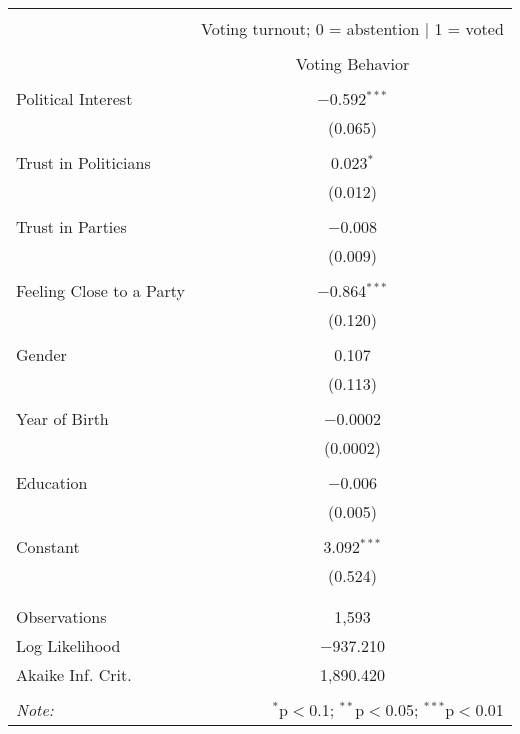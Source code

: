
\begin{table}[!htbp] \centering 
  \caption{} 
  \label{} 
\begin{tabular}{@{\extracolsep{5pt}}lc} 
\\[-1.8ex]\hline 
\hline \\[-1.8ex] 
 & \multicolumn{1}{c}{Voting turnout; 0 = abstention | 1 = voted} \\ 
\cline{2-2} 
\\[-1.8ex] & Voting Behavior \\ 
\hline \\[-1.8ex] 
 Political Interest & $-$0.592$^{***}$ \\ 
  & (0.065) \\ 
  & \\ 
 Trust in Politicians & 0.023$^{*}$ \\ 
  & (0.012) \\ 
  & \\ 
 Trust in Parties & $-$0.008 \\ 
  & (0.009) \\ 
  & \\ 
 Feeling Close to a Party & $-$0.864$^{***}$ \\ 
  & (0.120) \\ 
  & \\ 
 Gender & 0.107 \\ 
  & (0.113) \\ 
  & \\ 
 Year of Birth & $-$0.0002 \\ 
  & (0.0002) \\ 
  & \\ 
 Education & $-$0.006 \\ 
  & (0.005) \\ 
  & \\ 
 Constant & 3.092$^{***}$ \\ 
  & (0.524) \\ 
  & \\ 
\hline \\[-1.8ex] 
Observations & 1,593 \\ 
Log Likelihood & $-$937.210 \\ 
Akaike Inf. Crit. & 1,890.420 \\ 
\hline 
\hline \\[-1.8ex] 
\textit{Note:}  & \multicolumn{1}{r}{$^{*}$p$<$0.1; $^{**}$p$<$0.05; $^{***}$p$<$0.01} \\ 
\end{tabular} 
\end{table} 
